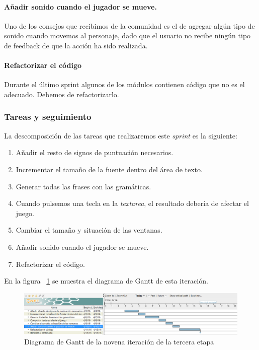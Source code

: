 \paragraph{Añadir sonido cuando el jugador se mueve.} Uno de los consejos que recibimos de la comunidad es el de agregar algún tipo de sonido cuando movemos al personaje, dado que el usuario no recibe ningún tipo de feedback de que la acción ha sido realizada.

\paragraph{Refactorizar el código} Durante el último sprint algunos de los módulos contienen código que no es el adecuado. Debemos de refactorizarlo.

\subsubsection{Tareas y seguimiento}

La descomposición de las tareas que realizaremos este \textit{sprint} es la siguiente:

\begin{enumerate}[label=\bfseries WBS 9.\arabic*]
  \item Añadir el resto de signos de puntuación necesarios.
  \item Incrementar el tamaño de la fuente dentro del área de texto.
  \item Generar todas las frases con las gramáticas.
  \item Cuando pulsemos una tecla en la \textit{textarea}, el resultado debería de afectar el juego.
  \item Cambiar el tamaño y situación de las ventanas.
  \item Añadir sonido cuando el jugador se mueve.
  \item Refactorizar el código.
\end{enumerate}

En la figura ~\ref{fig:sec3it9} se muestra el diagrama de Gantt de esta iteración.

\begin{figure}
    \includegraphics[width=\textwidth,height=\textheight,keepaspectratio]{./img/sec3it9.png}
  \caption{Diagrama de Gantt de la novena iteración de la tercera etapa}
  \label{fig:sec3it9}
\end{figure}

